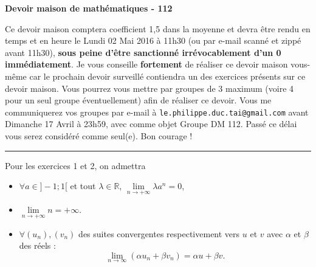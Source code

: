 \documentclass[10pt]{article}
\newcommand{\R}{\mathbb{R}}
\theoremstyle{exostyle}
\begin{document}
\setlength\parindent{0mm}
\vspace{0,25cm}



\begin{center}
    {\huge\bfseries Devoir maison de mathématiques  - 112}
    \par\bigskip
\end{center}

\begin{center}  Ce devoir maison comptera coefficient 1,5 dans la moyenne et devra être rendu en temps et en heure le Lundi 02 Mai 2016 à 11h30 (ou par e-mail scanné et zippé avant 11h30), \textbf{sous peine d'être sanctionné irrévocablement d'un 0 immédiatement}. Je vous conseille \textbf{fortement} de réaliser ce devoir maison vous-même car le prochain devoir surveillé contiendra un des exercices présents sur ce devoir maison. Vous pourrez vous mettre par groupes de 3 maximum (voire 4 pour un seul groupe éventuellement) afin de réaliser ce devoir. Vous me communiquerez vos groupes par e-mail à \texttt{le.philippe.duc.tai@gmail.com} avant Dimanche 17 Avril à 23h59, avec comme objet \og Groupe DM 112\fg. Passé ce délai vous serez considéré comme seul(e). Bon courage !
\end{center}
\hrule
\vspace{0.25cm}
Pour les exercices 1 et 2, on admettra
\begin{itemize}
    \item $\forall a\in ]-1;1[$ et tout $\lambda\in\R$, $\lim\limits_{n\to+\infty} \lambda a^n = 0$,
    \item $\lim\limits_{n\to+\infty} n = +\infty.$
    \item $\forall (u_n),(v_n)$ des suites convergentes respectivement vers $u$ et $v$ avec $\alpha$ et $\beta$ des réels : \[\lim\limits_{n\to\infty} (\alpha u_n + \beta v_n) = \alpha u + \beta v.\]
\end{itemize}
\end{document}
